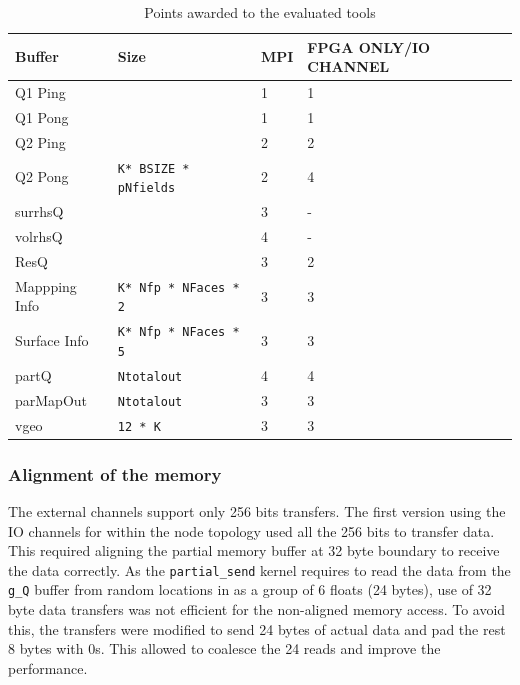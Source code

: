 \begin{table}[ht]
    \begin{center}
        \caption{Points awarded to the evaluated tools}
        \label{tab:channel_assign}
        \begin{tabular}{|l|l|C{3cm}|C{3.4cm}|} %
          \hline
          \textbf{Buffer} & \textbf{Size} & \textbf{MPI} & \textbf{FPGA ONLY/IO CHANNEL}\\
          \hline
          Q1 Ping &   & 1 & 1 \\
           
          Q1 Pong &  & 1 & 1 \\
           
          Q2 Ping &   & 2 & 2 \\
           
          Q2 Pong & \texttt{K* BSIZE * pNfields}  & 2 & 4 \\
           
          surrhsQ &   & 3 & - \\
           
          volrhsQ & & 4 & - \\
           
          ResQ & & 3 & 2 \\
          \hline
          Mappping Info & \texttt{K* Nfp * NFaces * 2}  & 3 & 3 \\
          \hline
          Surface Info & \texttt{K* Nfp * NFaces * 5} & 3 & 3 \\
          \hline
          partQ & \texttt{Ntotalout} & 4 & 4 \\
          \hline
          parMapOut & \texttt{Ntotalout}  & 3 & 3 \\
          \hline
          vgeo & \texttt{12 * K}  & 3 & 3 \\
          \hline
        \end{tabular}
    \end{center}
 \end{table}


\subsubsection*{Alignment of the memory}

The external channels support only 256 bits transfers. The first version
using the IO channels for within the node topology used all the 256 bits
to transfer data. This required aligning the partial memory buffer
at 32 byte boundary to receive the data correctly. As the \texttt{partial\_send}
kernel requires to read the data from the \texttt{g\_Q} buffer from random
locations in as a group of 6 floats (24 bytes), use of 32 byte data transfers
was not efficient for the non-aligned memory access. To avoid this, the transfers
were modified to send 24 bytes of actual data and pad the rest 8 bytes with 0s.
This allowed to coalesce the 24 reads and improve the performance.

